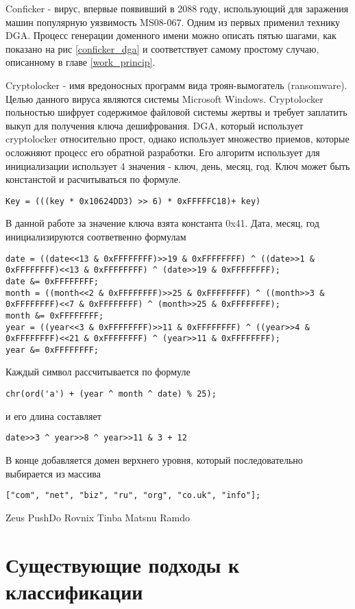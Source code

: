 Conficker - вирус, впервые появивший в 2088 году, использующий для заражения машин популярную уязвимость MS08-067. Одним из первых применил технику DGA. Процесс генерации доменного имени можно описать пятью шагами, как показано на рис \ref{conficker_dga}  и соответствует самому простому случаю, описанному в главе \ref{work_princip}.

Cryptolocker - имя вредоносных программ вида троян-вымогатель (ransomware). Целью данного вируса являются системы Microsoft Windows. Cryptolocker польностью шифрует содержимое файловой системы жертвы и требует заплатить выкуп для получения ключа дешифрования.
DGA, который использует cryptolocker относительно прост, однако использует множество приемов, которые осложняют процесс его обратной разработки. Его алгоритм использует для инициализации использует 4 значения - ключ, день, месяц, год.
Ключ может быть констанстой и расчитываться по формуле.
\begin{lstlisting}
Key = (((key * 0x10624DD3) >> 6) * 0xFFFFFC18)+ key)
\end{lstlisting}
В данной работе за значение ключа взята константа 0x41.
Дата, месяц, год инициализируются соответвенно формулам
\begin{lstlisting}
date = ((date<<13 & 0xFFFFFFFF)>>19 & 0xFFFFFFFF) ^ ((date>>1 & 0xFFFFFFFF)<<13 & 0xFFFFFFFF) ^ (date>>19 & 0xFFFFFFFF);
date &= 0xFFFFFFFF;
month = ((month<<2 & 0xFFFFFFFF)>>25 & 0xFFFFFFFF) ^ ((month>>3 & 0xFFFFFFFF)<<7 & 0xFFFFFFFF) ^ (month>>25 & 0xFFFFFFFF);
month &= 0xFFFFFFFF;
year = ((year<<3 & 0xFFFFFFFF)>>11 & 0xFFFFFFFF) ^ ((year>>4 & 0xFFFFFFFF)<<21 & 0xFFFFFFFF) ^ (year>>11 & 0xFFFFFFFF);
year &= 0xFFFFFFFF;
\end{lstlisting}
Каждый символ рассчитывается по формуле
\begin{lstlisting}
chr(ord('a') + (year ^ month ^ date) % 25);
\end{lstlisting}
и его длина составляет
\begin{lstlisting}
date>>3 ^ year>>8 ^ year>>11 & 3 + 12
\end{lstlisting}
В конце добавляется домен верхнего уровня, который последовательно выбирается из массива
\begin{lstlisting}
["com", "net", "biz", "ru", "org", "co.uk", "info"];
\end{lstlisting}
Zeus
PushDo
Rovnix
Tinba
Matsnu
Ramdo

\section{Существующие подходы к классификации}
